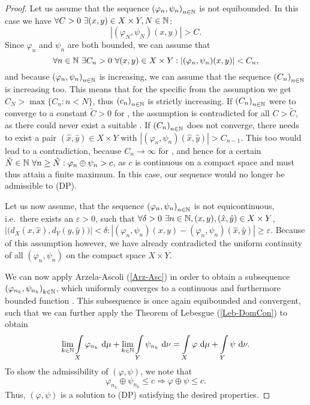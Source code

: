 \begin{proof}
	Let us assume that the sequence ${(\varphi_n, \psi_n)}_{\NinN}$ is not equibounded. In this case we have $\forall C > 0~\exists (x, y) \in X \times Y, \NinN[N]$:
	\[ |(\varphi_N, \psi_N)(x, y)| > C. \]
	Since $\varphi_n$ and $\psi_n$ are both bounded, we can assume that
	\[ \forall \NinN~\exists C_n > 0~\forall (x, y) \in X \times Y: |(\varphi_n, \psi_n)(x, y)| < C_n, \]
	and because ${(\varphi_n, \psi_n)}_{\NinN}$ is increasing, we can assume that the sequence ${(C_n)}_{\NinN}$ is increasing too. This means that for the specific \NinN[N] from the assumption we get $C_N > \max \{C_n : n < N \}$, thus ${(c_n)}_{\NinN}$ is strictly increasing. If ${(C_n)}_{\NinN}$ were to converge to a constant $\tilde{C} > 0$ for \Ninf{}, the assumption is contradicted for all $C > \tilde{C}$, as there could never exist a suitable \NinN. If ${(C_n)}_{\NinN}$ does not converge, there needs to exist a pair $(\hat{x}, \hat{y}) \in X \times Y$ with $|(\varphi_n, \psi_n)(\hat{x}, \hat{y})| > C_{n - 1}$. This too would lead to a contradiction, because $C_n \rightarrow \infty$ for \Ninf{}, and hence for a certain $\NinN[\tilde{N}]~\forall n \ge \tilde{N}: \varphi_n \oplus \psi_n > c$, as $c$ is continuous on a compact space and must thus attain a finite maximum. In this case, our sequence would no longer be admissible to (DP).
	
	Let us now assume, that the sequence ${(\varphi_n, \psi_n)}_{\NinN}$ is not equicontinuous, i.e.\ there exists an $\varepsilon > 0$, such that $\forall \delta > 0~\exists \NinN, (x, y), (\hat{x}, \hat{y}) \in X \times Y$, $\big\vert\big( d_X(x, \hat{x}), d_Y(y, \hat{y}) \big)\big\vert< \delta: |(\varphi_n, \psi_n)(x, y) - (\varphi_n, \psi_n)(\hat{x}, \hat{y})| \ge \varepsilon$. Because of this assumption however, we have already contradicted the uniform continuity of all $(\varphi_n, \psi_n)$ on the compact space $X \times Y$.
	
	We can now apply Arzela-Ascoli (\ref{Arz-Asc}) in order to obtain a subsequence ${(\varphi_{n_k}, \psi_{n_k})}_{\NinN[k]}$, which uniformly converges to a continuous and furthermore bounded function . This subsequence is once again equibounded and convergent, such that we can further apply the Theorem of Lebesgue (\ref{Leb-DomCon}) to obtain
	\[ \lim\limits_{\NinN[k]} \int\limits_X \varphi_{n_k}~\D + \lim\limits_{\NinN[k]} \int\limits_Y \psi_{n_k}~\D[\nu] = \int\limits_X \varphi~\D + \int\limits_Y \psi~\D[\nu]. \]
	To show the admissibility of $(\varphi, \psi)$, we note that
	\[ \varphi_{n_k} \oplus \psi_{n_k} \le c \Rightarrow \varphi \oplus \psi \le c. \]
	Thus, $(\varphi, \psi)$ is a solution to (DP) satisfying the desired properties.
\end{proof}

